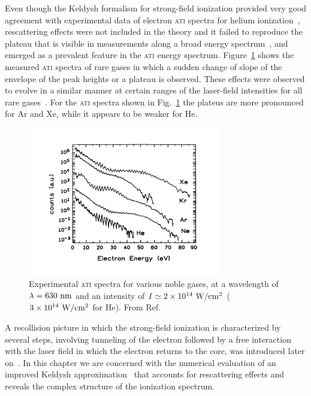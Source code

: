 Even though the Keldysh formalism for strong-field ionization provided
very good agreement with experimental data of electron \textsc{ati}
spectra for helium ionization~\cite{Walker_1994exp}, rescattering
effects were not included in the theory and it failed to reproduce the
plateau that is visible in measurements along a broad energy
spectrum~\cite{Paulus_1994plateau, Walker_1996}, and emerged as a
prevalent feature in the \textsc{ati} energy
spectrum. Figure~\ref{fig:plateau_ATI} shows the measured \textsc{ati}
spectra of rare gases in which a sudden change of slope of the
envelope of the peak heights or a plateau is observed. These effects
were observed to evolve in a similar manner at certain ranges of the
laser-field intensities for all rare
gases~\cite{Paulus_1994plateau}. For the \textsc{ati} spectra shown in
Fig.~\ref{fig:plateau_ATI} the plateus are more pronounced for Ar and
Xe, while it appears to be weaker for He.

\begin{figure}
  \centering
  \includegraphics[width=0.75\textwidth]{figures/ch_ATI_SFA/plateauPRL72}
  \caption{Experimental \textsc{ati} spectra for various noble gases,
    at a wavelength of $\lambda = 630\ \rm{nm}$ and an intensity of $I
    \simeq 2\times 10^{14}\ \rm{W/cm^{2}}$ ($3\times
    10^{14}\ \rm{W/cm^{2}}$ for He). From
    Ref.~\cite{Paulus_1994plateau}}
  \label{fig:plateau_ATI}
\end{figure}

A recollision picture in which the strong-field ionization is
characterized by several steps, involving tunneling of the electron
followed by a free interaction with the laser field in which the
electron returns to the core, was introduced later
on~\cite{Corkum_1993, LewensteinSPA_1994}. In this chapter we are
concerned with the numerical evaluation of an improved Keldysh
approximation~\cite{Kopold_1997sfa} that accounts for rescattering
effects and reveals the complex structure of the ionization spectrum.

